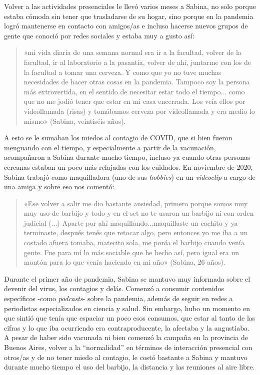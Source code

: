 Volver a las actividades presenciales le llevó varios meses a Sabina, no solo porque estaba cómoda sin tener que trasladarse de su hogar, sino porque en la pandemia logró mantenerse en contacto con amigos/as e incluso hacerse nuevos grupos de gente que conoció por redes sociales y estaba muy a gusto así:

\begin{quote}
«mi vida diaria de una semana normal era ir a la facultad, volver de la facultad, ir al laboratorio a la pasantía, volver de ahí, juntarme con los de la facultad a tomar una cerveza. Y como que yo no tuve muchas necesidades de hacer otras cosas en la pandemia. Tampoco soy la persona más extrovertida, en el sentido de necesitar estar todo el tiempo... como que no me jodió tener que estar en mi casa encerrada. Los veía ellos por videollamada (risas) y tomábamos cerveza por videollamada y era medio lo mismo» (Sabina, veintiséis años).
\end{quote}

A esto se le sumaban los miedos al contagio de COVID, que si bien fueron menguando con el tiempo, y especialmente a partir de la vacunación, acompañaron a Sabina durante mucho tiempo, incluso ya cuando otras personas cercanas estaban un poco más relajadas con los cuidados. En noviembre de 2020, Sabina trabajó como maquilladora (uno de sus \emph{hobbies}) en un \emph{videoclip} a cargo de una amiga y sobre eso nos comentó:

\begin{quote}
«Ese volver a salir me dio bastante ansiedad, primero porque somos muy muy uso de barbijo y todo y en el set no te usaron un barbijo ni con orden judicial (...) Aparte por ahí maquillando...maquillaste un cachito y ya terminaste, después tenés que retocar algo, pero entonces yo me iba a un costado afuera tomaba, matecito sola, me ponía el barbijo cuando venía gente. Fue para mí lo más sociable que he hecho así, pero igual era un montón para lo que venía haciendo en mi año» (Sabina, 26 años).
\end{quote}

Durante el primer año de pandemia, Sabina se mantuvo muy informada sobre el devenir del virus, los contagios y delás. Comenzó a consumir contenidos específicos -como \emph{podcasts}- sobre la pandemia, además de seguir en redes a periodistas especializados en ciencia y salud. Sin embargo, hubo un momento en que sintió que tenía que espaciar un poco esos consumos, que estar al tanto de las cifras y lo que iba ocurriendo era contraproducente, la afectaba y la angustiaba. A pesar de haber sido vacunada ni bien comenzó la campaña en la provincia de Buenos Aires, volver a la ``normalidad'' en términos de interacción presencial con otros/as y de no tener miedo al contagio, le costó bastante a Sabina y mantuvo durante mucho tiempo el uso del barbijo, la distancia y las reuniones al aire libre.

